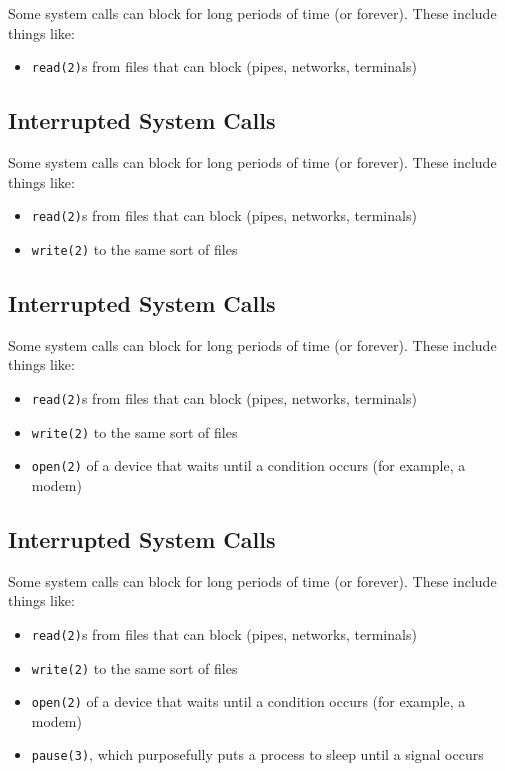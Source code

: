 \documentclass[xga]{xdvislides}
\begin{document}
Some system calls can block for long periods of time (or forever). These
include things like:

\begin{itemize}
	\item {\tt read(2)}s from files that can block (pipes, networks, terminals)
\end{itemize}

\subsection{Interrupted System Calls}

Some system calls can block for long periods of time (or forever). These
include things like:

\begin{itemize}
	\item {\tt read(2)}s from files that can block (pipes, networks, terminals)
	\item {\tt write(2)} to the same sort of files
\end{itemize}

\subsection{Interrupted System Calls}

Some system calls can block for long periods of time (or forever). These
include things like:

\begin{itemize}
	\item {\tt read(2)}s from files that can block (pipes, networks, terminals)
	\item {\tt write(2)} to the same sort of files
	\item {\tt open(2)} of a device that waits until a condition occurs (for example, a modem)
\end{itemize}



\subsection{Interrupted System Calls}

Some system calls can block for long periods of time (or forever). These
include things like:

\begin{itemize}
	\item {\tt read(2)}s from files that can block (pipes, networks, terminals)
	\item {\tt write(2)} to the same sort of files
	\item {\tt open(2)} of a device that waits until a condition occurs (for example, a modem)
	\item {\tt pause(3)}, which purposefully puts a process to sleep until a signal occurs
\end{itemize}
\end{document}
